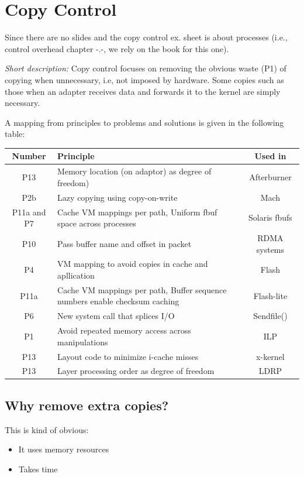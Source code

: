 \chapter{Copy Control} \label{CHAP:COPYCTL}

Since there are no slides and the copy control ex. sheet is about processes (i.e., control overhead chapter -.-, we rely on the book for this one).

\textit{Short description:} Copy control focuses on removing the obvious waste (P1) of copying when unnecessary, i.e, not imposed by hardware. Some copies such as those when an adapter receives data and forwards it to the kernel are simply necessary.

A mapping from principles to problems and solutions is given in the following table:

\begin{tabular}{|c|p{8cm}|c|}
\hline 
Number & Principle & Used in \\ 
\hline 
P13 & Memory location (on adaptor) as degree of freedom) & Afterburner \\ 
\hline 
P2b & Lazy copying using copy-on-write & Mach \\ 
\hline 
P11a and P7 & Cache VM mappings per path, Uniform fbuf space across processes & Solaris fbufs \\ 
\hline 
P10 & Pass buffer name and offset in packet & RDMA systems \\ 
\hline 
P4 & VM mapping to avoid copies in cache and apllication & Flash \\ 
\hline 
P11a & Cache VM mappings per path, Buffer sequence numbers enable checksum caching & Flash-lite \\ 
\hline 
P6 & New system call that splices I/O & Sendfile() \\ 
\hline 
P1 & Avoid repeated memory access across manipulations & ILP \\ 
\hline 
P13 & Layout code to minimize i-cache misses & x-kernel \\ 
\hline 
P13 & Layer processing order as degree of freedom & LDRP \\ 
\hline 
\end{tabular} 

\section{Why remove extra copies?}

This is kind of obvious:

\begin{itemize}
    \item It uses memory resources
    \item Takes time
\end{itemize}

